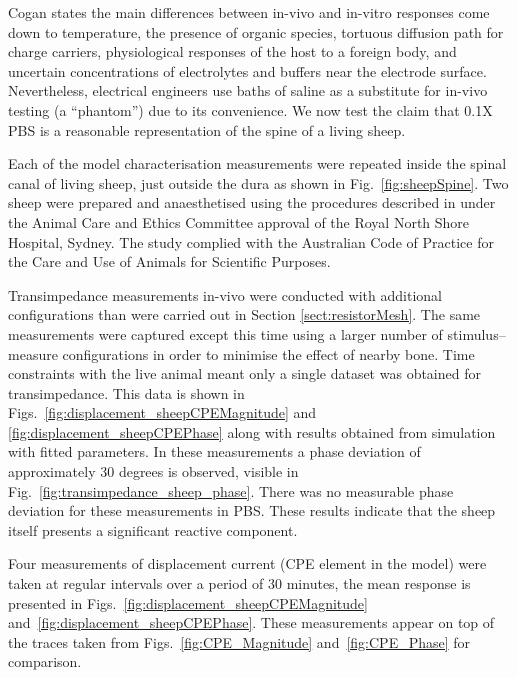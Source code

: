 \documentclass[journal, a4paper]{IEEEtran}
\begin{document}
Cogan states the main differences between in-vivo and in-vitro responses come down to temperature, the presence of organic species, tortuous diffusion path for charge carriers, physiological responses of the host to a foreign body, and uncertain concentrations of electrolytes and buffers near the electrode surface.\cite{Cogan2008}
Nevertheless, electrical engineers use baths of saline as a substitute for in-vivo testing (a ``phantom'') due to its convenience.
We now test the claim that 0.1X PBS is a reasonable representation of the spine of a living sheep.

{\color{blue} Each of the model characterisation} measurements were repeated inside the spinal canal of living sheep, just outside the dura as shown in Fig.~\ref{fig:sheepSpine}. Two sheep were prepared and anaesthetised using the procedures described in \cite{Parker2013} under the Animal Care and Ethics Committee approval of the Royal North Shore Hospital, Sydney. The study complied with the Australian Code of Practice for the Care and Use of Animals for Scientific Purposes.

{
    \color{blue}
    Transimpedance measurements in-vivo were {\color{blue} conducted with} additional configurations than were carried out in Section \ref{sect:resistorMesh}. The same measurements were captured {\color{blue} except this time using a larger number of stimulus--measure configurations} in order to minimise the effect of nearby bone. Time constraints with the live animal meant only {\color{blue} a single} dataset was obtained for transimpedance. {\color{blue} This data is} shown in Figs.~\ref{fig:displacement_sheepCPEMagnitude} and \ref{fig:displacement_sheepCPEPhase} along with results obtained {\color{blue} from} simulation {\color{blue} with} fitted parameters.
}
{\color{blue} In these measurements a phase deviation of approximately 30 degrees is observed, visible in Fig.~\ref{fig:transimpedance_sheep_phase}. There was no measurable phase deviation for these measurements in PBS. These results indicate that the sheep itself presents a significant reactive component.}

{\color{blue}
    Four measurements of displacement current (CPE element in the model) were} taken at regular intervals over a period of 30 minutes, {\color{blue} the mean response is presented} in Figs.~\ref{fig:displacement_sheepCPEMagnitude} and~\ref{fig:displacement_sheepCPEPhase}.
{\color{blue} These measurements appear on top of the traces taken from Figs.~\ref{fig:CPE_Magnitude} and~\ref{fig:CPE_Phase} for comparison.}
\end{document}
